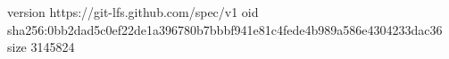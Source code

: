 version https://git-lfs.github.com/spec/v1
oid sha256:0bb2dad5c0ef22de1a396780b7bbbf941e81c4fede4b989a586e4304233dac36
size 3145824
